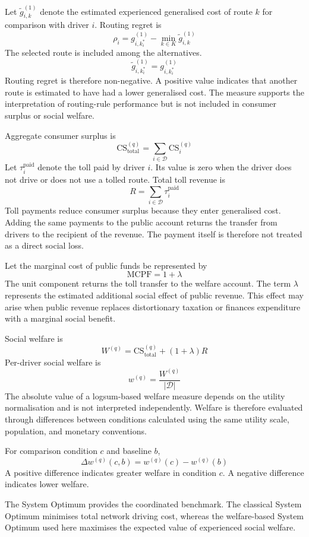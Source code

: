 \documentclass{article}
\begin{document}
Let $\tilde g_{i,k}^{(1)}$ denote the estimated experienced generalised cost of route $k$ for comparison with driver $i$. Routing regret is
\[
\rho_i
=
g_{i,k_i^*}^{(1)}
-
\min_{k\in K}
\tilde g_{i,k}^{(1)}
\]
The selected route is included among the alternatives.
\[
\tilde g_{i,k_i^*}^{(1)}
=
g_{i,k_i^*}^{(1)}
\]
Routing regret is therefore non-negative. A positive value indicates that another route is estimated to have had a lower generalised cost. The measure supports the interpretation of routing-rule performance but is not included in consumer surplus or social welfare.

Aggregate consumer surplus is
\[
\mathrm{CS}_{\mathrm{total}}^{(q)}
=
\sum_{i\in\mathcal D}
\mathrm{CS}_i^{(q)}
\]
Let $\tau_i^{\mathrm{paid}}$ denote the toll paid by driver $i$. Its value is zero when the driver does not drive or does not use a tolled route. Total toll revenue is
\[
R
=
\sum_{i\in\mathcal D}
\tau_i^{\mathrm{paid}}
\]
Toll payments reduce consumer surplus because they enter generalised cost. Adding the same payments to the public account returns the transfer from drivers to the recipient of the revenue. The payment itself is therefore not treated as a direct social loss.

Let the marginal cost of public funds be represented by
\[
\mathrm{MCPF}
=
1+\lambda
\]
The unit component returns the toll transfer to the welfare account. The term $\lambda$ represents the estimated additional social effect of public revenue. This effect may arise when public revenue replaces distortionary taxation or finances expenditure with a marginal social benefit.

Social welfare is
\[
W^{(q)}
=
\mathrm{CS}_{\mathrm{total}}^{(q)}
+
(1+\lambda)R
\]
Per-driver social welfare is
\[
w^{(q)}
=
\frac{W^{(q)}}{|\mathcal D|}
\]
The absolute value of a logsum-based welfare measure depends on the utility normalisation and is not interpreted independently. Welfare is therefore evaluated through differences between conditions calculated using the same utility scale, population, and monetary conventions.

For comparison condition $c$ and baseline $b$,
\[
\Delta w^{(q)}(c,b)
=
w^{(q)}(c)
-
w^{(q)}(b)
\]
A positive difference indicates greater welfare in condition $c$. A negative difference indicates lower welfare.

The System Optimum provides the coordinated benchmark. The classical System Optimum minimises total network driving cost, whereas the welfare-based System Optimum used here maximises the expected value of experienced social welfare.
\end{document}

